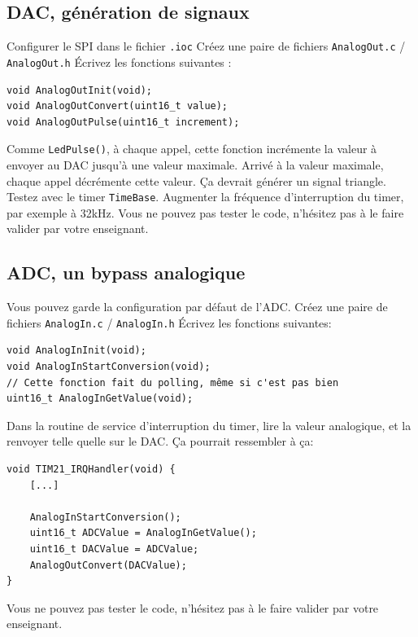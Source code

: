 \documentclass[12pt,%
addpoints,%
]{exam}
\begin{document}
\subsection{DAC, génération de signaux}
\begin{questions}
	\question Configurer le SPI dans le fichier \texttt{.ioc}
	\question Créez une paire de fichiers \texttt{AnalogOut.c} / \texttt{AnalogOut.h}
	\question Écrivez les fonctions suivantes :
	\begin{verbatim}
void AnalogOutInit(void);
void AnalogOutConvert(uint16_t value);
void AnalogOutPulse(uint16_t increment);
	\end{verbatim}
	Comme \texttt{LedPulse()}, à chaque appel, cette fonction incrémente la valeur à envoyer au DAC jusqu'à une valeur maximale. 
	Arrivé à la valeur maximale, chaque appel décrémente cette valeur.
	Ça devrait générer un signal triangle.
	\question Testez avec le timer \texttt{TimeBase}. Augmenter la fréquence d'interruption du timer, par exemple à 32kHz.
	\question Vous ne pouvez pas tester le code, n'hésitez pas à le faire valider par votre enseignant.
\end{questions}

\subsection{ADC, un bypass analogique}
\begin{questions}
	\question Vous pouvez garde la configuration par défaut de l'ADC.
	\question Créez une paire de fichiers \texttt{AnalogIn.c} / \texttt{AnalogIn.h}
	\question Écrivez les fonctions suivantes:
	\begin{verbatim}
void AnalogInInit(void);
void AnalogInStartConversion(void);
// Cette fonction fait du polling, même si c'est pas bien
uint16_t AnalogInGetValue(void);
	\end{verbatim}
	\question Dans la routine de service d'interruption du timer, lire la valeur analogique, et la renvoyer telle quelle sur le DAC. Ça pourrait ressembler à ça:
	\begin{verbatim}
void TIM21_IRQHandler(void) {
    [...]

    AnalogInStartConversion();
    uint16_t ADCValue = AnalogInGetValue();
    uint16_t DACValue = ADCValue;
    AnalogOutConvert(DACValue);
}
	\end{verbatim}
	\question Vous ne pouvez pas tester le code, n'hésitez pas à le faire valider par votre enseignant.

\end{questions}
\end{document}
